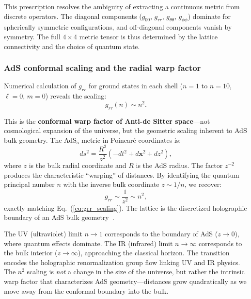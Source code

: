 \documentclass[aps,prd,twocolumn,superscriptaddress,groupedaddress,showpacs]{revtex4-2}
\begin{document}
This prescription resolves the ambiguity of extracting a continuous metric from discrete operators. The diagonal components ($g_{00}$, $g_{rr}$, $g_{\theta\theta}$, $g_{\phi\phi}$) dominate for spherically symmetric configurations, and off-diagonal components vanish by symmetry. The full $4 \times 4$ metric tensor is thus determined by the lattice connectivity and the choice of quantum state.

\subsubsection{AdS conformal scaling and the radial warp factor}

Numerical calculation of $g_{rr}$ for ground states in each shell ($n=1$ to $n=10$, $\ell=0$, $m=0$) reveals the scaling:
\begin{equation}
g_{rr}(n) \sim n^2. \label{eq:grr_scaling}
\end{equation}

This is the \textbf{conformal warp factor of Anti-de Sitter space}---not cosmological expansion of the universe, but the geometric scaling inherent to AdS bulk geometry. The AdS$_5$ metric in Poincar\'e coordinates is:
\begin{equation}
ds^2 = \frac{R^2}{z^2} \left( -dt^2 + d\mathbf{x}^2 + dz^2 \right),
\end{equation}
where $z$ is the bulk radial coordinate and $R$ is the AdS radius. The factor $z^{-2}$ produces the characteristic ``warping'' of distances. By identifying the quantum principal number $n$ with the inverse bulk coordinate $z \sim 1/n$, we recover:
\begin{equation}
g_{rr} \sim \frac{1}{z^2} \sim n^2,
\end{equation}
exactly matching Eq.~(\ref{eq:grr_scaling}). The lattice is the discretized holographic boundary of an AdS bulk geometry~\cite{Maldacena1998}.

The UV (ultraviolet) limit $n \to 1$ corresponds to the boundary of AdS ($z \to 0$), where quantum effects dominate. The IR (infrared) limit $n \to \infty$ corresponds to the bulk interior ($z \to \infty$), approaching the classical horizon. The transition encodes the holographic renormalization group flow linking UV and IR physics. The $n^2$ scaling is \emph{not} a change in the size of the universe, but rather the intrinsic warp factor that characterizes AdS geometry---distances grow quadratically as we move away from the conformal boundary into the bulk.
\end{document}
